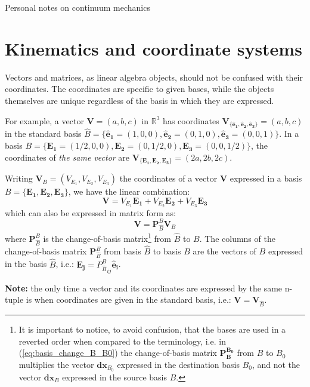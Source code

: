 \documentclass[letterpaper,12pt,oneside]{report}
\begin{document}
\begin{center}
Personal notes on continuum mechanics
\end{center}

\section{Kinematics and coordinate systems}

Vectors and matrices, as linear algebra objects, should not be confused with their coordinates. The coordinates are specific to given bases, while the objects themselves are unique regardless of the basis in which they are expressed.

For example, a vector $\mathbf{V}=(a,b,c)$ in $\mathbb{R}^3$ has coordinates $\mathbf{V}_{\{\mathbf{\hat{e}_1},\mathbf{\hat{e}_2},\mathbf{\hat{e}_3}\}} = (a,b,c)$ in the standard basis $\hat{B}=\{\mathbf{\hat{e}_1} =(1,0,0),\mathbf{\hat{e}_2} =(0,1,0),\mathbf{\hat{e}_3} =(0,0,1)\}$. In a basis $B=\{\mathbf{E_1} =(1/2,0,0),\mathbf{E_2} =(0,1/2,0),\mathbf{E_3} =(0,0,1/2)\}$, the coordinates of \emph{the same vector} are $\mathbf{V}_{\{\mathbf{E_1},\mathbf{E_2},\mathbf{E_3}\}} = (2a,2b,2c)$. 

Writing $\mathbf{V}_B = (V_{E_1},V_{E_2},V_{E_3})$ the coordinates of a vector $\mathbf{V}$ expressed in a basis $B=\{\mathbf{E_1},\mathbf{E_2},\mathbf{E_3}\}$, we have the linear combination:
\begin{equation}
\mathbf{V} = V_{E_1}\mathbf{E_1} + V_{E_2}\mathbf{E_2} + V_{E_3}\mathbf{E_3}
\end{equation}
which can also be expressed in matrix form as:
\begin{equation}
\mathbf{V} = \mathbf{P}_{\hat{B}}^B \mathbf{V}_B
\end{equation}
where $\mathbf{P}_{\hat{B}}^B$ is the change-of-basis matrix\footnote{It is important to notice, to avoid confusion, that the bases are used in a reverted order when compared to the terminology, i.e. in (\ref{eq:basis_change_B_B0}) the change-of-basis matrix $\mathbf{P_B^{B_0}}$ from $B$ to $B_0$ multiplies the vector $\mathbf{dx}_{B_0}$ expressed in the destination basis $B_0$, and not the vector $\mathbf{dx}_B$ expressed in the source basis $B$.} from $\hat{B}$ to $B$. The columns of the change-of-basis matrix $\mathbf{P}_{\hat{B}}^B$ from basis $\hat{B}$ to basis $B$ are the vectors of $B$ expressed in the basis $\hat{B}$, i.e.: $\mathbf{E_j} = {P_{\hat{B}}^B}_{ij}\mathbf{\hat{e}_i}$.

\textbf{Note:} the only time a vector and its coordinates are expressed by the same n-tuple is when coordinates are given in the standard basis, i.e.: $\mathbf{V}=\mathbf{V}_{\hat{B}}$.
\end{document}
